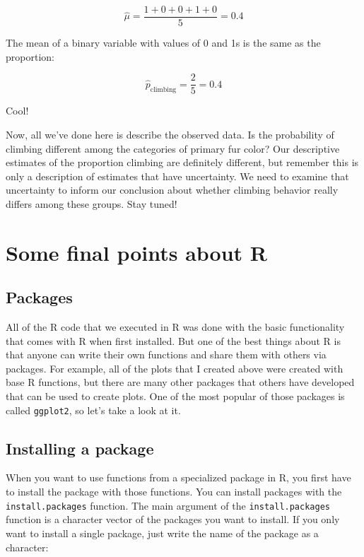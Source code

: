 \documentclass[
]{book}
\begin{document}
\[
\hat{\mu} = \frac{1 + 0 + 0 + 1 + 0}{5}=0.4
\]

The mean of a binary variable with values of 0 and 1s is the same as the proportion:

\[
\hat{p}_{\text{climbing}} = \frac{2}{5} = 0.4
\]

Cool!

Now, all we've done here is describe the observed data. Is the probability of climbing different among the categories of primary fur color? Our descriptive estimates of the proportion climbing are definitely different, but remember this is only a description of estimates that have uncertainty. We need to examine that uncertainty to inform our conclusion about whether climbing behavior really differs among these groups. Stay tuned!

\section{Some final points about R}\label{some-final-points-about-r}

\subsection{Packages}\label{packages}

All of the R code that we executed in R was done with the basic functionality that comes with R when first installed. But one of the best things about R is that anyone can write their own functions and share them with others via packages. For example, all of the plots that I created above were created with base R functions, but there are many other packages that others have developed that can be used to create plots. One of the most popular of those packages is called \texttt{ggplot2}, so let's take a look at it.

\subsection{Installing a package}\label{installing-a-package}

When you want to use functions from a specialized package in R, you first have to install the package with those functions. You can install packages with the \texttt{install.packages} function. The main argument of the \texttt{install.packages} function is a character vector of the packages you want to install. If you only want to install a single package, just write the name of the package as a character:
\end{document}
